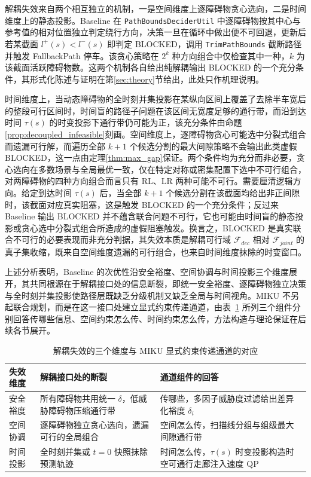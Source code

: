 \documentclass[a4paper,11pt]{ctexart}
\theoremstyle{definition}
\begin{document}
解耦失效来自两个相互独立的机制，一是空间维度上逐障碍物贪心选向，二是时间维度上的静态投影。Baseline 在 \texttt{PathBoundsDeciderUtil} 中逐障碍物按其中心与参考值的相对位置独立判定绕行方向，决策一旦在循环中做出便不可回退，更新后若某截面 $l^{+}(s) < l^{-}(s)$ 即判定 BLOCKED，调用 \texttt{TrimPathBounds} 截断路径并触发 FallbackPath 停车。该贪心策略在 $2^k$ 种方向组合中仅检查其中一种，$k$ 为该截面活跃障碍物数。这两个机制各自给出纯解耦输出 BLOCKED 的一个充分条件，其形式化陈述与证明在第\ref{sec:theory}节给出，此处只作机理说明。

时间维度上，当动态障碍物的全时刻并集投影在某纵向区间上覆盖了去除半车宽后的整段可行区间时，时间盲的路径子问题在该区间无宽度足够的通行带，而沿到达时间 $\tau(s)$ 的时变投影下通行带仍可能为正，该充分条件由命题\ref{prop:decoupled_infeasible}刻画。空间维度上，逐障碍物贪心可能选中分裂式组合而遗漏可行解，而遍历全部 $k+1$ 个候选分割的最大间隙策略不会输出此类虚假 BLOCKED，这一点由定理\ref{thm:max_gap}保证。两个条件均为充分而非必要，贪心选向在多数场景与全局最优一致，仅在特定对称或密集配置下选中不可行组合，对两障碍物的四种方向组合而言只有 RL、LR 两种可能不可行。需要厘清逻辑方向。给定到达时间 $\tau(s)$ 后，当全部 $k+1$ 个候选分割在该截面均给出非正间隙时，该截面对应真实阻塞，这是触发 BLOCKED 的一个充分条件；反过来 Baseline 输出 BLOCKED 并不蕴含联合问题不可行，它也可能由时间盲的静态投影或贪心选中分裂式组合所造成的虚假阻塞触发。换言之，BLOCKED 是真实联合不可行的必要表现而非充分判据，其失效本质是解耦可行域 $\mathcal{F}_{dec}$ 相对 $\mathcal{F}_{joint}$ 的真子集收缩，既来自空间维度遗漏的可行组合，也来自时间维度抹除的时变窗口。

上述分析表明，Baseline 的次优性沿安全裕度、空间协调与时间投影三个维度展开，其共同根源在于解耦接口处的信息断裂，即统一安全裕度、逐障碍物独立决策与全时刻并集投影使路径层既缺乏分级机制又缺乏全局与时间视角。MIKU 不另起联合规划，而是在这一接口处建立显式约束传递通道，由表~\ref{tab:prob_channel} 所列三个组件分别回答传哪些信息、空间约束怎么传、时间约束怎么传，方法构造与理论保证在后续各节展开。

\begin{table}[htbp]
\centering
\caption{解耦失效的三个维度与 MIKU 显式约束传递通道的对应}
\label{tab:prob_channel}
\begin{tabular}{p{2.4cm} p{4.6cm} p{4.6cm}}
\hline
失效维度 & 解耦接口处的断裂 & 通道组件的回答 \\
\hline
安全裕度 & 所有障碍物共用统一 $\delta$，低威胁障碍物压缩通行带 & 传哪些，多因子威胁度过滤给出差异化裕度 $\delta_i$ \\
空间协调 & 逐障碍物独立贪心选向，遗漏可行的全局组合 & 空间怎么传，扫描线分组与组级最大间隙通行带 \\
时间投影 & 全时刻并集或 $t{=}0$ 快照抹除预测轨迹 & 时间怎么传，$\tau(s)$ 时变投影构造时空可通行走廊注入速度 QP \\
\hline
\end{tabular}
\end{table}
\end{document}
